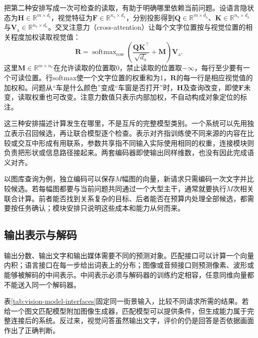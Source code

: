 把第二种安排写成一次可检查的读取，有助于明确哪里依赖当前问题。设语言隐状态为$\bm H\in\mathbb R^{m\times d_{\mathrm l}}$，视觉特征为$\bm F\in\mathbb R^{n_{\mathrm v}\times d_{\mathrm v}}$，分别投影得到$\bm Q\in\mathbb R^{m\times d_{\mathrm a}}$、$\bm K\in\mathbb R^{n_{\mathrm v}\times d_{\mathrm a}}$与$\bm V_{\mathrm a}\in\mathbb R^{n_{\mathrm v}\times d_{\mathrm o}}$。交叉注意力（cross-attention）让每个文字位置按与视觉位置的相关程度加权读取视觉值：
\begin{equation}
  \bm R=\operatorname{softmax}_{\mathrm{row}}
     \left(\frac{\bm Q\bm K^\top}{\sqrt{d_{\mathrm a}}}+\bm M\right)
     \bm V_{\mathrm a}.
  \label{eq:vision-models-cross-read}
\end{equation}
这里$\bm M\in\mathbb R^{m\times n_{\mathrm v}}$在允许读取的位置取0，禁止读取的位置取$-\infty$，每行至少要有一个可读位置。行softmax使一个文字位置的权重和为1，$\bm R$的每一行是相应视觉值的加权和。问题从“车是什么颜色”变成“车窗是否打开”时，$\bm H$及查询改变，即使$\bm F$未变，读取权重也可改变。注意力数值只表示内部加权，不自动构成对象定位的标注。

这三种安排描述计算发生在哪里，不是互斥的完整模型类别。一个系统可以先用独立表示召回候选，再让联合模型逐个检查。表示对齐指训练使不同来源的内容在比较或交互中形成有用联系，参数共享指不同输入实际使用相同的权重，连接模块则负责把形状或信息路径接起来。两套编码器即使输出同样维数，也没有因此完成语义对齐。

以图库查询为例，独立编码可以保存$M$幅图的向量，新请求只需编码一次文字并比较候选。若每幅图都要与当前问题共同通过一个大型主干，通常就要执行$M$次相关联合计算。前者能否找到关系复杂的目标、后者能否在预算内处理全部候选，都需要按任务确认；模块安排只说明这些成本和能力从何而来。

\subsection{输出表示与解码}
\label{sec:vision-models-output}

输出分数、输出文字和输出媒体需要不同的预测对象。匹配接口可以计算一个向量内积；语言接口在每一步给出词表上的分布；图像或音频接口则预测像素、波形或能够被解码的中间表示。中间表示必须与解码器的训练约定相容，任意同维向量都不能送入同一个解码器。

表\ref{tab:vision-model-interfaces}固定同一街景输入，比较不同请求所需的结果。若给一个图文匹配模型附加图像生成器，匹配模型可以提供条件，但生成能力属于完整连接后的系统。反过来，视觉问答虽然输出文字，评价的仍是回答是否依据画面作出了正确判断。

